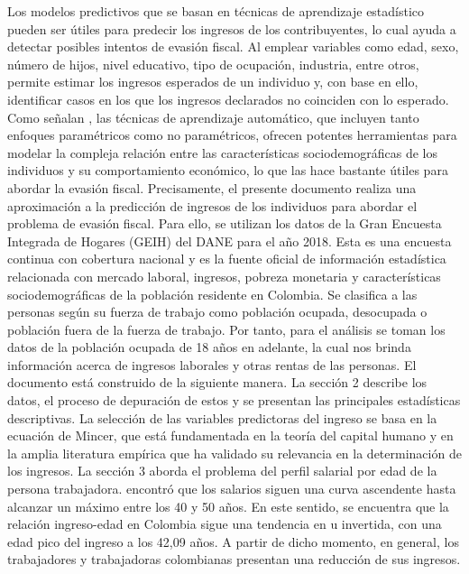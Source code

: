 \documentclass[12pt,a4paper,onecolumn]{article}
\begin{document}
\bigbreak
Los modelos predictivos que se basan en técnicas de aprendizaje estadístico pueden ser útiles para predecir los ingresos de los contribuyentes, lo cual ayuda a detectar posibles intentos de evasión fiscal. Al emplear variables como edad, sexo, número de hijos, nivel educativo, tipo de ocupación, industria, entre otros, permite estimar los ingresos esperados de un individuo y, con base en ello, identificar casos en los que los ingresos declarados no coinciden con lo esperado. Como señalan \cite{james2013}, las técnicas de aprendizaje automático, que incluyen tanto enfoques paramétricos como no paramétricos, ofrecen potentes herramientas para modelar la compleja relación entre las características sociodemográficas de los individuos y su comportamiento económico, lo que las hace bastante útiles para abordar la evasión fiscal.
\bigbreak
Precisamente, el presente documento realiza una aproximación a la predicción de ingresos de los individuos para abordar el problema de evasión fiscal. Para ello, se utilizan los datos de la Gran Encuesta Integrada de Hogares (GEIH) del DANE para el año 2018. Esta es una encuesta continua con cobertura nacional y es la fuente oficial de información estadística relacionada con mercado laboral, ingresos, pobreza monetaria y características sociodemográficas de la población residente en Colombia. Se clasifica a las personas según su fuerza de trabajo como población ocupada, desocupada o población fuera de la fuerza de trabajo. Por tanto, para el análisis se toman los datos de la población ocupada de 18 años en adelante, la cual nos brinda información acerca de ingresos laborales y otras rentas de las personas.
\bigbreak
El documento está construido de la siguiente manera. La sección 2 describe los datos, el proceso de depuración de estos y se presentan las principales estadísticas descriptivas. La selección de las variables predictoras del ingreso se basa en la ecuación de Mincer, que está fundamentada en la teoría del capital humano y en la amplia literatura empírica que ha validado su relevancia en la determinación de los ingresos.
\bigbreak
La sección 3 aborda el problema del perfil salarial por edad de la persona trabajadora. \cite{mincer1974} encontró que los salarios siguen una curva ascendente hasta alcanzar un máximo entre los 40 y 50 años. En este sentido, se encuentra que la relación ingreso-edad en Colombia sigue una tendencia en u invertida, con una edad pico del ingreso a los 42,09 años. A partir de dicho momento, en general, los trabajadores y trabajadoras colombianas presentan una reducción de sus ingresos.
\end{document}
